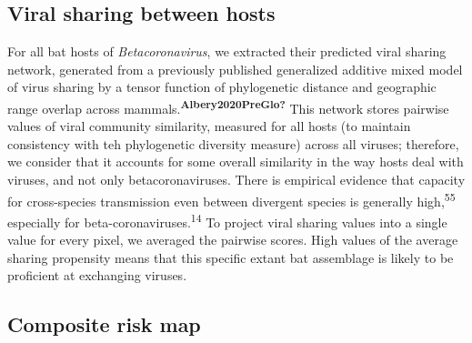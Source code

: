 \documentclass[10pt,oneside]{article}
\begin{document}
\hypertarget{viral-sharing-between-hosts}{%
\subsection{Viral sharing between
hosts}\label{viral-sharing-between-hosts}}

For all bat hosts of \emph{Betacoronavirus}, we extracted their
predicted viral sharing network, generated from a previously published
generalized additive mixed model of virus sharing by a tensor function
of phylogenetic distance and geographic range overlap across
mammals.\textsuperscript{\textbf{Albery2020PreGlo?}} This network stores
pairwise values of viral community similarity, measured for all hosts
(to maintain consistency with teh phylogenetic diversity measure) across
all viruses; therefore, we consider that it accounts for some overall
similarity in the way hosts deal with viruses, and not only
betacoronaviruses. There is empirical evidence that capacity for
cross-species transmission even between divergent species is generally
high,\textsuperscript{55} especially for
beta-coronaviruses.\textsuperscript{14} To project viral sharing values
into a single value for every pixel, we averaged the pairwise scores.
High values of the average sharing propensity means that this specific
extant bat assemblage is likely to be proficient at exchanging viruses.

\hypertarget{composite-risk-map}{%
\subsection{Composite risk map}\label{composite-risk-map}}
\end{document}
